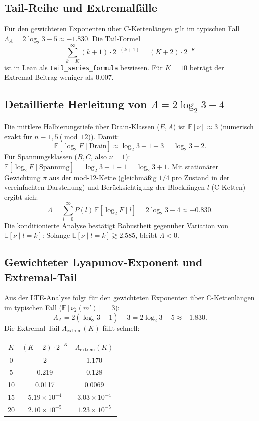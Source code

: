 \documentclass[12pt,a4paper]{article}
\newcommand{\vii}{\nu_2}
\newcommand{\Lam}{\Lambda}
\begin{document}
\subsection{Tail-Reihe und Extremalfälle}

Für den gewichteten Exponenten über C-Kettenlängen gilt im typischen Fall
$\Lambda_A = 2\log_2 3 - 5 \approx -1.830$.
Die Tail-Formel
\[
  \sum_{k=K}^{\infty}(k+1)\cdot 2^{-(k+1)} = (K+2)\cdot 2^{-K}
\]
ist in Lean als \texttt{tail\_series\_formula} bewiesen.
Für $K=10$ beträgt der Extremal-Beitrag weniger als $0.007$.

\subsection{Detaillierte Herleitung von $\Lam = 2\log_2 3 - 4$}

Die mittlere Halbierungstiefe über Drain-Klassen ($E,A$) ist
$\mathbb{E}[\nu] \approx 3$ (numerisch exakt für $n \equiv 1,5 \pmod{12}$).
Damit:
\[
  \mathbb{E}[\log_2 F \mid \text{Drain}] \approx \log_2 3 + 1 - 3
  = \log_2 3 - 2.
\]
Für Spannungsklassen ($B,C$, also $\nu = 1$):
$\mathbb{E}[\log_2 F \mid \text{Spannung}] = \log_2 3 + 1 - 1 = \log_2 3 + 1$.
Mit stationärer Gewichtung $\pi$ aus der mod-12-Kette (gleichmäßig
$1/4$ pro Zustand in der vereinfachten Darstellung) und Berücksichtigung
der Blocklängen $l$ (C-Ketten) ergibt sich:
\[
  \Lam = \sum_{l=0}^{\infty} P(l)\,\mathbb{E}[\log_2 F \mid l]
  = 2\log_2 3 - 4 \approx -0.830.
\]
Die konditionierte Analyse bestätigt Robustheit gegenüber Variation von
$\mathbb{E}[\nu \mid l=k]$: Solange $\mathbb{E}[\nu \mid l=k] \gtrsim 2.585$,
bleibt $\Lam < 0$.

\subsection{Gewichteter Lyapunov-Exponent und Extremal-Tail}

Aus der LTE-Analyse folgt für den gewichteten Exponenten über C-Kettenlängen
im typischen Fall ($\mathbb{E}[\vii(m')] = 3$):
\[
  \Lambda_A = 2(\log_2 3 - 1) - 3 = 2\log_2 3 - 5 \approx -1.830.
\]
Die Extremal-Tail $\Lambda_{\mathrm{extrem}}(K)$ fällt schnell:

\begin{center}
\begin{tabular}{ccc}
\toprule
$K$ & $(K+2)\cdot 2^{-K}$ & $\Lambda_{\mathrm{extrem}}(K)$ \\
\midrule
0 & 2 & 1.170 \\
5 & 0.219 & 0.128 \\
10 & 0.0117 & 0.0069 \\
15 & $5.19\times 10^{-4}$ & $3.03\times 10^{-4}$ \\
20 & $2.10\times 10^{-5}$ & $1.23\times 10^{-5}$ \\
\bottomrule
\end{tabular}
\end{center}
\end{document}
